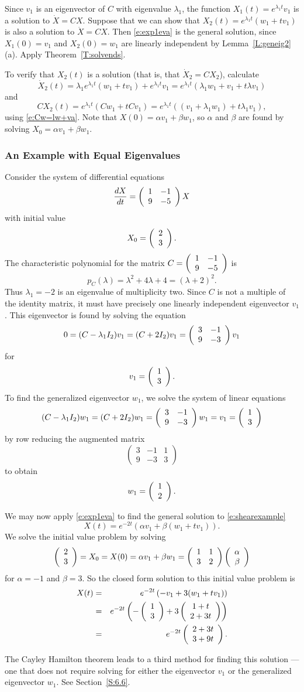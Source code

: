 \documentclass{ximera}
\begin{document}
Since $v_1$ is an eigenvector of $C$ with eigenvalue $\lambda_1$, the
function $X_1(t)=e^{\lambda_1 t}v_1$ is a solution to $\dot{X}=CX$.  Suppose
that we can show that $X_2(t)=e^{\lambda_1 t}(w_1+tv_1)$ is also a solution
to $\dot{X}=CX$.  Then \eqref{e:exp1eva} is the general solution, since
$X_1(0)=v_1$ and $X_2(0)=w_1$ are linearly independent by 
Lemma~\ref{L:geneig2}(a).  Apply Theorem~\ref{T:solvends}.

To verify that $X_2(t)$ is a solution (that is, that $\dot{X}_2=CX_2$),
calculate
\[
\dot{X}_2(t) = \lambda_1 e^{\lambda_1 t}(w_1+tv_1) + e^{\lambda_1 t}v_1=
e^{\lambda_1 t}(\lambda_1 w_1 + v_1 +t\lambda v_1)
\]
and
\[
CX_2(t) = e^{\lambda_1 t}(Cw_1+tCv_1) = e^{\lambda_1 t}
((v_1+\lambda_1 w_1)+t\lambda_1 v_1),
\]
using \eqref{e:Cw=lw+va}.  Note that $X(0)=\alpha v_1 + \beta w_1$, so $\alpha$
and $\beta$ are found by solving $X_0= \alpha v_1 + \beta w_1$.

\subsubsection*{An Example with Equal Eigenvalues}

Consider the system of differential equations
\begin{equation}  \label{e:shearexample}
\frac{dX}{dt} = \left(\begin{array}{rr} 1 & -1\\ 9 &-5\end{array}\right) X
\end{equation}
with initial value
\[
X_0 = \left(\begin{array}{r} 2 \\ 3\end{array}\right).
\]
The characteristic polynomial for the matrix $C=\left(\begin{array}{rr} 1 & -1\\ 9 &-5\end{array}\right)$ is
\[
p_C(\lambda) = \lambda^2 + 4\lambda +4 = (\lambda + 2)^2.
\]
Thus $\lambda_1=-2$ is an eigenvalue of multiplicity two.  Since
$C$ is not a multiple of the identity matrix, it must have
precisely one linearly independent eigenvector $v_1$.  This eigenvector is
found by solving the equation
\[
0 = (C-\lambda_1I_2)v_1 = (C+2I_2)v_1 = \left(\begin{array}{rr} 3 & -1\\ 9 &-3\end{array}\right)v_1
\]
for
\[
v_1=\left(\begin{array}{r} 1 \\ 3\end{array}\right).
\]
To find the generalized eigenvector $w_1$, we solve the system of linear
equations
\[
(C-\lambda_1I_2)w_1=(C+2I_2)w_1=\left(\begin{array}{rr} 3 & -1\\ 9 &-3\end{array}\right)w_1= v_1=\left(\begin{array}{r} 1 \\ 3\end{array}\right)
\]
by row reducing the augmented matrix
\[
\left(\begin{array}{rr|r} 3 & -1 & 1\\ 9 & -3 & 3 \end{array}\right)
\]
to obtain
\[
w_1 = \left(\begin{array}{r} 1 \\ 2\end{array}\right).
\]

We may now apply \eqref{e:exp1eva} to find the general solution to
\eqref{e:shearexample}
\[
X(t) = e^{-2t}\left(\alpha v_1 +\beta (w_1+tv_1)\right).
\]
We solve the initial value problem by solving
\[
\left(\begin{array}{r} 2 \\ 3\end{array}\right) = X_0 = X(0) = \alpha v_1 +\beta w_1 =
\left(\begin{array}{rr} 1 & 1\\ 3 &2\end{array}\right)\left(\begin{array}{r} \alpha \\ \beta\end{array}\right)
\]
for $\alpha=-1$ and $\beta=3$.   So the closed form solution to this initial
value problem is
\begin{eqnarray*}
X(t) & = & e^{-2t}\left(-v_1 + 3(w_1+tv_1)\right)\\
& = & e^{-2t}\left(-\left(\begin{array}{r} 1 \\ 3\end{array}\right)+3\left(\begin{array}{c} 1+t \\ 2+3t\end{array}\right)\right)\\
& = & e^{-2t}\left(\begin{array}{r} 2+3t \\ 3+9t\end{array}\right).
\end{eqnarray*}

The Cayley Hamilton theorem leads to a third method for finding this solution 
--- one that does not require solving for either the eigenvector $v_1$ or the 
generalized eigenvector $w_1$.  See Section~\ref{S:6.6}.

\EXER

\end{document}
